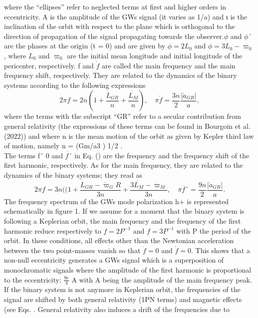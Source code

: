 \documentclass[a4paper,10.5pt]{article}
\begin{document}
\thispagestyle{empty}

where the “ellipses” refer to neglected terms at first and higher orders in eccentricity. A is the amplitude of the GWs signal (it varies as 1/a) and ι is the inclination of the orbit with respect to the plane which is orthogonal to the direction of propagation of the signal propagating towards the observer.$\phi$ and $ \phi ´$ are the phases at the origin (t = 0) and are given by $\phi = 2L_0$ and  $\phi = 3L_0 - \varpi_0$, where $L_0$ and $\varpi_0$ are the initial mean longitude and initial longitude of the pericenter, respectively. f and $\dot{f}$ are called the main frequency and the main frequency shift, respectively. They are related to the dynamics of the binary systems according to the following expressions
\begin{equation}\tag{2.4}
    2\pi f = 2n (1+ \frac{\dot{L}_{GR}}{n}+ \frac{\dot{L_M}}{n}), \quad 
    \pi\dot{f}= \frac{3n}{2} \frac{|\dot{a}_{GR}|}{a},
\end{equation}
where the terms with the subscript “GR” refer to a secular contribution from general relativity (the expressions of these terms can be found in Bourgoin et al. (2022)) and where n is the mean motion of the orbit as given by Kepler third law of motion, namely n = (Gm/a3 ) 1/2 .\\
The terms f´ 0 and $\dot{f ´}$ in Eq. () are the frequency and the frequency shift of the first harmonic, respectively. As for the main frequency, they are related to the dynamics of the binary systems; they read as
\begin{equation} \tag{2.5}
     2\pi f = 3n( (1+ \frac{\dot{L}_{GR} - \dot{\varpi}_GR}{3n}+ \frac{3\dot{L_M}-\dot{\varpi}_M }{3n}, \quad 
    \pi\dot{f´}= \frac{9n}{2} \frac{|\dot{a}_{GR}|}{a}.
\end{equation}
The frequency spectrum of the GWs mode polarization h+  is represented schematically in figure 1. If we assume for a moment that the binary system is following a Keplerian orbit, the main frequency and the frequency of the first harmonic reduce respectively to $f = 2P^{−1} $  and $f = 3P^{−1}$ with P the period of the orbit. In these conditions, all effects other than the Newtonian acceleration between the two point-masses vanish so that $\dot{f} = 0$ and $\dot{f} = 0.$ This shows that a non-null eccentricity generates a GWs signal which is a superposition of monochromatic signals where the amplitude of the first harmonic is proportional to the eccentricity: $\frac{9e}{ 4}$ A with A being the amplitude of the main frequency peak. If the binary system is not anymore in Keplerian orbit, the frequencies of the signal are shifted by both general relativity (1PN terms) and magnetic effects (see Eqs. . General relativity  also induces a drift of the frequencies due to
\end{document}
